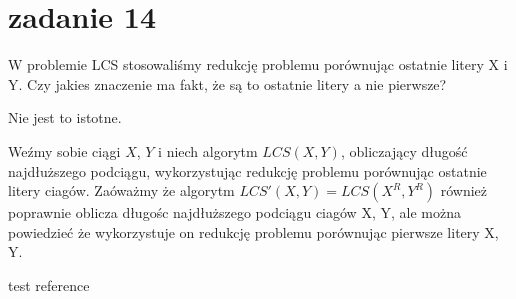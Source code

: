 \documentclass[svgnames]{report}
\begin{document}

\section{zadanie 14}
\begin{framed}
W problemie LCS stosowaliśmy redukcję problemu porównując ostatnie litery X i Y. Czy jakies znaczenie ma fakt, że są to ostatnie litery a nie pierwsze?
\end{framed}
Nie jest to istotne.

Weźmy sobie ciągi $X$, $Y$ i niech algorytm $LCS(X, Y)$, obliczający długość najdłuższego podciągu, wykorzystując redukcję problemu porównując ostatnie litery ciagów.
Zaóważmy że algorytm $LCS'(X, Y) = LCS(X^R, Y^R)$ również poprawnie oblicza długośc najdłuższego podciągu ciagów X, Y, ale można powiedzieć że wykorzystuje on redukcję problemu porównując pierwsze litery X, Y.



\begin{thebibliography}{99}
 test reference
\end{thebibliography}
\end{document}
